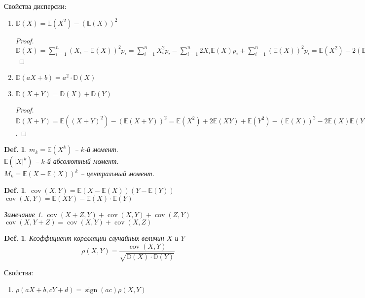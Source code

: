 \documentclass[12pt]{article}
\newenvironment{MyList}[1][4pt]{
  \begin{enumerate}[1.]
  \setlength{\parskip}{0pt}
  \setlength{\itemsep}{#1}
}{       
  \end{enumerate}
}
\def\E{\mathbb{E}}
\def\D{\mathbb{D}}
\theoremstyle{definition} %
\theoremstyle{plain} %
\newtheorem{Def}[Thm]{Def.} %
\theoremstyle{remark} %
\newtheorem{Rem}[Thm]{Замечание} %
\DeclareMathOperator{\cov}{cov}
\DeclareMathOperator{\sign}{sign}
\begin{document}
Свойства дисперсии:
\begin{MyList}
    \item $\D(X)  = \E(X^2) - (\E(X))^2$ 
    \begin{proof}
        $\D(X) = \sum_{i=1}^{n} (X_i - \E(X))^2 p_i = \sum_{i=1}^{n} X_i^2 p_i - \sum_{i=1}^{n} 2 X_i \E(X) p_i + \sum_{i=1}^{n} (\E(X))^2 p_i = \E(X^2) - 2(\E(X))^2 + (\E(X))^2 \cdot 1 = \E(X^2) - (\E(X))^2$ 
    \end{proof}
    \item $\D(aX + b) = a^2 \cdot \D(X)$
    \item $\D(X + Y) = \D(X) + \D(Y)$ 
    \begin{proof}
        $\D(X + Y) = \E((X + Y)^2) - (\E(X + Y))^2 = \E(X^2) + 2\E(XY) + \E(Y^2) - (\E(X))^2 - 2\E(X)\E(Y) - (\E(Y))^2$.
    \end{proof}
\end{MyList}

\begin{Def}
    $m_k = \E(X^k)$ -- $k$-й момент. \\
    $\E(|X|^k)$ -- $k$-й абсолютный момент. \\
    $M_k = \E(X - \E(X))^k$ -- центральный момент.
\end{Def}

\begin{Def}
    $\cov (X, Y) = \E(X - \E(X))(Y - \E(Y))$ \\
    $\cov (X, Y) = \E(XY) - \E(X) \cdot \E(Y)$  
\end{Def}

\begin{Rem}
    $\cov (X + Z, Y) + \cov(X, Y) + \cov(Z, Y)$ \\
    $\cov (X, Y + Z) = \cov(X, Y) + \cov(X, Z)$ 
\end{Rem}

\begin{Def}
    Коэффициент корелляции случайных величин $X$ и $Y$ 
    \[\rho(X, Y) = \frac{\cov (X, Y)}{\sqrt{\D(X) \cdot \D(Y)}}\]
\end{Def}

Свойства:

\begin{MyList}
    \item $\rho(aX + b, cY + d) = \sign (ac) \rho(X, Y)$ 
\end{MyList}
\end{document}
